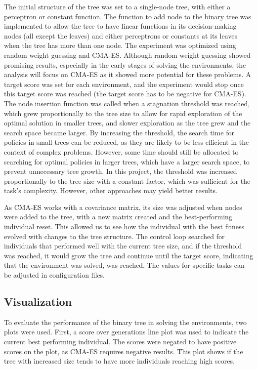 The initial structure of the tree was set to a single-node tree, with either a perceptron or constant function. The function to add node to the binary tree was implemented to allow the tree to have linear functions in its decision-making nodes (all except the leaves) and either perceptrons or constants at its leaves when the tree has more than one node. The experiment was optimized using random weight guessing and CMA-ES. Although random weight guessing showed promising results, especially in the early stages of solving the environments, the analysis will focus on CMA-ES as it showed more potential for these problems. A target score was set for each environment, and the experiment would stop once this target score was reached (the target score has to be negative for CMA-ES). The node insertion function was called when a stagnation threshold was reached, which grew proportionally to the tree size to allow for rapid exploration of the optimal solution in smaller trees, and slower exploration as the tree grew and the search space became larger. By increasing the threshold, the search time for policies in small trees can be reduced, as they are likely to be less efficient in the context of complex problems. However, some time should still be allocated to searching for optimal policies in larger trees, which have a larger search space, to prevent unnecessary tree growth. In this project, the threshold was increased proportionally to the tree size with a constant factor, which was sufficient for the task's complexity. However, other approaches may yield better results.

As CMA-ES works with a covariance matrix, its size was adjusted when nodes were added to the tree, with a new matrix created and the best-performing individual reset. This allowed us to see how the individual with the best fitness evolved with changes to the tree structure. The control loop searched for individuals that performed well with the current tree size, and if the threshold was reached, it would grow the tree and continue until the target score, indicating that the environment was solved, was reached. The values for specific tasks can be adjusted in configuration files.

\subsection{Visualization}
\label{visualization}
To evaluate the performance of the binary tree in solving the environments, two plots were used. First, a score over generations line plot was used to indicate the current best performing individual. The scores were negated to have positive scores on the plot, as CMA-ES requires negative results. This plot shows if the tree with increased size tends to have more individuals reaching high scores.

